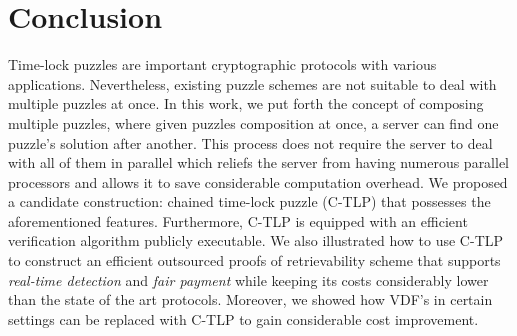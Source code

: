 \vspace{-6mm}
\section{Conclusion}


Time-lock puzzles are important cryptographic protocols with various applications. Nevertheless,  existing puzzle schemes are not suitable to deal with multiple puzzles at once.  In this work, we put forth the concept of composing multiple puzzles, where given puzzles composition at once, a server can find one puzzle's solution after another. This process does not require the server to deal with all of them in parallel which reliefs the server from having numerous parallel processors and allows it to save considerable computation overhead. We proposed a candidate construction: chained  time-lock puzzle (C-TLP) that possesses the aforementioned features. Furthermore, C-TLP is equipped with an efficient verification algorithm publicly executable.  We also illustrated how to use C-TLP to construct an  efficient outsourced  proofs of retrievability scheme that supports \emph{real-time detection} and \emph{fair payment} while keeping its costs considerably lower than the state of the art protocols. Moreover, we showed how VDF's in certain settings can be replaced with C-TLP to gain considerable cost improvement.





